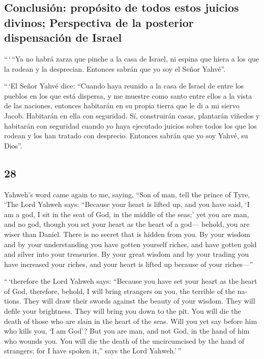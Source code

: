 \begin{paracol}{2}
\hypertarget{conclusiuxf3n-propuxf3sito-de-todos-estos-juicios-divinos-perspectiva-de-la-posterior-dispensaciuxf3n-de-israel}{%
\subsection{Conclusión: propósito de todos estos juicios divinos;
Perspectiva de la posterior dispensación de
Israel}\label{conclusiuxf3n-propuxf3sito-de-todos-estos-juicios-divinos-perspectiva-de-la-posterior-dispensaciuxf3n-de-israel}}

 ``\,`\,``Ya no habrá zarza que pinche a la casa de
Israel, ni espina que hiera a los que la rodean y la desprecian.
Entonces sabrán que yo soy el Señor Yahvé''.

 ``\,`El Señor Yahvé dice: ``Cuando haya reunido a la
casa de Israel de entre los pueblos en los que está dispersa, y me
muestre como santo entre ellos a la vista de las naciones, entonces
habitarán en su propia tierra que le di a mi siervo Jacob.
 Habitarán en ella con seguridad. Sí, construirán casas,
plantarán viñedos y habitarán con seguridad cuando yo haya ejecutado
juicios sobre todos los que los rodean y los han tratado con desprecio.
Entonces sabrán que yo soy Yahvé, su Dios''.

\switchcolumn
\begin{otherlanguage}{english}

\hypertarget{section-55}{%
\section{28}\label{section-55}}

 Yahweh's word came again to me, saying, 
``Son of man, tell the prince of Tyre, `The Lord Yahweh says: ``Because
your heart is lifted up, and you have said, `I am a god, I sit in the
seat of God, in the middle of the seas;' yet you are man, and no god,
though you set your heart as the heart of a god--- 
behold, you are wiser than Daniel. There is no secret that is hidden
from you.  By your wisdom and by your understanding you
have gotten yourself riches, and have gotten gold and silver into your
treasuries.  By your great wisdom and by your trading you
have increased your riches, and your heart is lifted up because of your
riches---''

 ``\,`therefore the Lord Yahweh says: ``Because you have
set your heart as the heart of God,  therefore, behold, I
will bring strangers on you, the terrible of the nations. They will draw
their swords against the beauty of your wisdom. They will defile your
brightness.  They will bring you down to the pit. You will
die the death of those who are slain in the heart of the seas.
 Will you yet say before him who kills you, `I am God'?
But you are man, and not God, in the hand of him who wounds you.
 You will die the death of the uncircumcised by the hand
of strangers; for I have spoken it,'' says the Lord Yahweh.'\,''


\end{otherlanguage}
\end{paracol}
